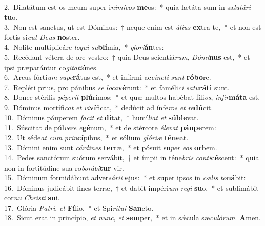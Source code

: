 {2.~}Dilatátum est os meum super i\textit{ni}\textit{mí}\textit{cos} \textbf{me}os:~* quia lætáta sum in sa\textit{lu}\textit{tá}\textit{ri} \textbf{tu}o.\\
{3.~}Non est sanctus, ut est Dóminus:~† neque enim est \textit{á}\textit{li}\textit{us} \textbf{ex}tra te,~* et non est fortis si\textit{cut} \textit{De}\textit{us} \textbf{no}ster.\\
{4.~}Nolíte multiplicáre \textit{lo}\textit{qui} \textit{su}\textbf{blí}mia,~* \textit{glo}\textit{ri}\textbf{án}tes:\\
{5.~}Recédant vétera de ore vestro:~† quia Deus scientiá\textit{rum}, \textit{Dó}\textit{mi}\textbf{nus} est,~* et ipsi præparántur co\textit{gi}\textit{ta}\textit{ti}\textbf{ó}nes.\\
{6.~}Arcus fórti\textit{um} \textit{su}\textit{pe}\textbf{rá}tus est,~* et infírmi ac\textit{cín}\textit{cti} \textit{sunt} \textbf{ró}\textbf{bo}re.\\
{7.~}Repléti prius, pro pánibus \textit{se} \textit{lo}\textit{ca}\textbf{vé}runt:~* et faméli\textit{ci} \textit{sa}\textit{tu}\textbf{rá}\textbf{ti} sunt.\\
{8.~}Donec stérilis \textit{pé}\textit{pe}\textit{rit} \textbf{plú}rimos:~* et quæ multos habébat fíli\textit{os}, \textit{in}\textit{fir}\textbf{má}\textbf{ta} est.\\
{9.~}Dóminus mortífi\textit{cat} \textit{et} \textit{vi}\textbf{ví}ficat,~* dedúcit ad ínfe\textit{ros} \textit{et} \textit{re}\textbf{dú}cit.\\
{10.~}Dóminus páuperem \textit{fa}\textit{cit} \textit{et} \textbf{di}tat,~* humí\textit{li}\textit{at} \textit{et} \textbf{sú}\textbf{ble}vat.\\
{11.~}Súscitat de púl\textit{ve}\textit{re} \textit{e}\textbf{gé}num,~* et de stércore \textit{é}\textit{le}\textit{vat} \textbf{páu}\textbf{pe}rem:\\
{12.~}Ut séde\textit{at} \textit{cum} \textit{prin}\textbf{cí}pibus,~* et sólium \textit{gló}\textit{ri}\textit{æ} \textbf{té}\textbf{ne}at.\\
{13.~}Dómini enim sunt \textit{cár}\textit{di}\textit{nes} \textbf{ter}ræ,~* et pósuit su\textit{per} \textit{e}\textit{os} \textbf{or}bem.\\
{14.~}Pedes sanctórum suórum servábit,~† et ímpii in téne\textit{bris} \textit{con}\textit{ti}\textbf{cé}scent:~* quia non in fortitúdine sua ro\textit{bo}\textit{rá}\textit{bi}\textbf{tur} vir.\\
{15.~}Dóminum formidábunt adver\textit{sá}\textit{ri}\textit{i} \textbf{e}jus:~* et super ipsos in \textit{cæ}\textit{lis} \textit{to}\textbf{ná}bit:\\
{16.~}Dóminus judicábit fines terræ,~† et dabit impéri\textit{um} \textit{re}\textit{gi} \textbf{su}o,~* et sublimábit cor\textit{nu} \textit{Chri}\textit{sti} \textbf{su}i.\\
{17.~}Glória \textit{Pa}\textit{tri}, \textit{et} \textbf{Fí}lio,~* et Spi\textit{rí}\textit{tu}\textit{i} \textbf{San}cto.\\
{18.~}Sicut erat in princípio, \textit{et} \textit{nunc}, \textit{et} \textbf{sem}per,~* et in sǽcula sæ\textit{cu}\textit{ló}\textit{rum}. \textbf{A}men.\\
